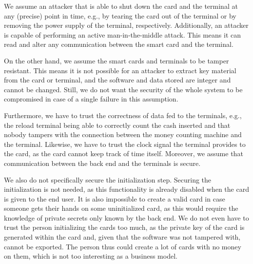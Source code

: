 \documentclass{article}
\begin{document}
We assume an attacker that is able to shut down the card and the terminal at any (precise) point in time, e.g., by tearing the card out of the terminal or by removing the power supply of the terminal, respectively.
Additionally, an attacker is capable of performing an active man-in-the-middle attack.
This means it can read and alter any communication between the smart card and the terminal.

On the other hand, we assume the smart cards and terminals to be tamper resistant.
This means it is not possible for an attacker to extract key material from the card or terminal, and the software and data stored are integer and cannot be changed.
Still, we do not want the security of the whole system to be compromised in case of a single failure in this assumption.

Furthermore, we have to trust the correctness of data fed to the terminals, e.g., the reload terminal being able to correctly count the cash inserted and that nobody tampers with the connection between the money counting machine and the terminal.
Likewise, we have to trust the clock signal the terminal provides to the card, as the card cannot keep track of time itself.
Moreover, we assume that communication between the back end and the terminals is secure.

We also do not specifically secure the initialization step.
Securing the initialization is not needed, as this functionality is already disabled when the card is given to the end user.
It is also impossible to create a valid card in case someone gets their hands on some uninitialized card, as this would require the knowledge of private secrets only known by the back end.
We do not even have to trust the person initializing the cards too much, as the private key of the card is generated within the card and, given that the software was not tampered with, cannot be exported.
The person thus could create a lot of cards with no money on them, which is not too interesting as a business model.
\end{document}
